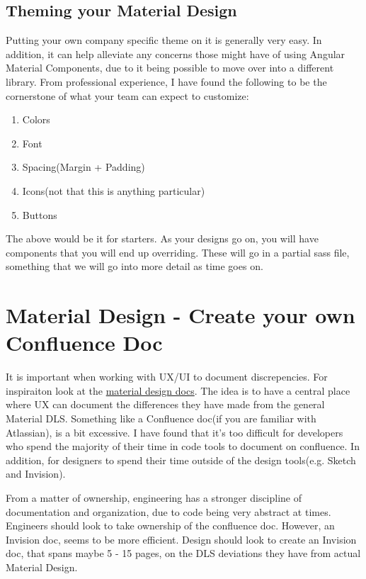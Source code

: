 \subsection{Theming your Material Design}
Putting your own company specific theme on it is generally very easy. In
addition, it can help alleviate any concerns those might have of using Angular
Material Components, due to it being possible to move over into a different
library. From professional experience, I have found the following to be the
cornerstone of what your team can expect to customize:
\begin{enumerate}
  \item Colors
  \item Font
  \item Spacing(Margin + Padding)
  \item Icons(not that this is anything particular)
  \item Buttons
\end{enumerate}

The above would be it for starters. As your designs go on, you will have
components that you will end up overriding. These will go in a partial sass
file, something that we will go into more detail as time goes on.

\section{ Material Design - Create your own Confluence Doc }
It is important when working with UX/UI to document discrepencies. For
inspiraiton look at the \href{https://material.io/guidelines/components/sliders.html}{material design docs}. The idea is to have a central place where UX can document the
differences they have made from the general Material DLS. Something like a
Confluence doc(if you are familiar with Atlassian), is a bit excessive. I have
found that it's too difficult for developers who spend the majority of their
time in code tools to document on confluence. In addition, for designers to
spend their time outside of the design tools(e.g. Sketch and Invision).

From a matter of ownership, engineering has a stronger discipline of
documentation and organization, due to code being very abstract at times.
Engineers should look to take ownership of the confluence doc. However, an
Invision doc, seems to be more efficient. Design should look to create an
Invision doc, that spans maybe 5 - 15 pages, on the DLS deviations they have
from actual Material Design.

